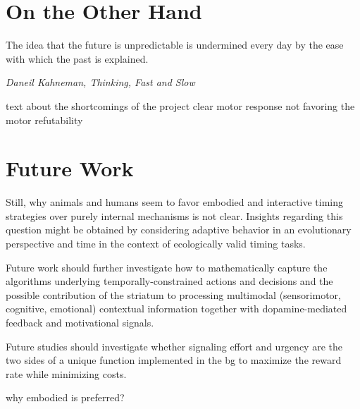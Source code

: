 \section{On the Other Hand}
\epigraph{The idea that the future is unpredictable is undermined every day by the ease with which the past is explained.}
{\textit{Daneil Kahneman, Thinking, Fast and Slow}}
\noindent
text about the shortcomings of the project
clear motor response
not favoring the motor
refutability




\section{Future Work}

Still, why animals and humans seem to favor embodied and interactive timing strategies over purely internal mechanisms is not clear.
Insights regarding this question might be obtained by considering adaptive behavior in an evolutionary perspective\cite{Cisek2019} and time in the context of ecologically valid timing tasks\cite{vanRijn2018}.


Future work should further investigate how to mathematically capture the algorithms underlying temporally-constrained actions and decisions and the possible contribution of the striatum to processing multimodal (sensorimotor, cognitive, emotional) contextual information together with dopamine-mediated feedback and motivational signals.


Future studies should investigate whether signaling effort and urgency are the two sides of a unique function implemented in the \gls{bg} to maximize the reward rate while minimizing costs.




why embodied is preferred?